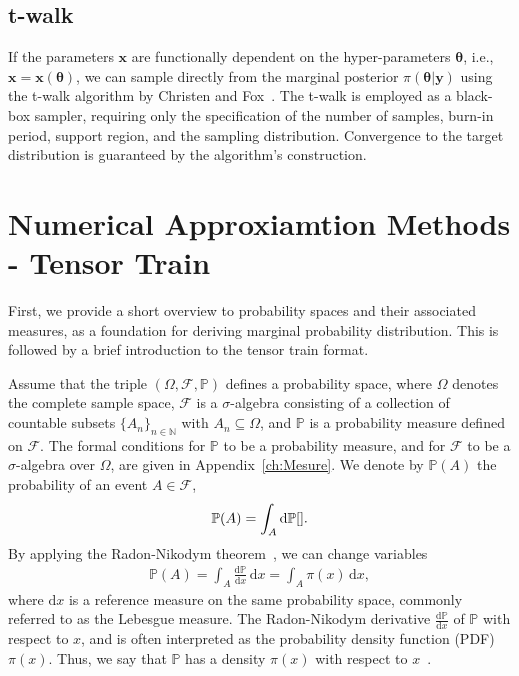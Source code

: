 \subsection{t-walk}
If the parameters $\bm{x}$ are functionally dependent on the hyper-parameters $\bm{\theta}$, i.e., $\bm{x} = \bm{x}(\bm{\theta})$, we can sample directly from the marginal posterior $\pi(\bm{\theta} | \bm{y})$ using the t-walk algorithm by Christen and Fox~\cite{christen2010general}. 
The t-walk is employed as a black-box sampler, requiring only the specification of the number of samples, burn-in period, support region, and the sampling distribution. 
Convergence to the target distribution is guaranteed by the algorithm’s construction.

\section{Numerical Approxiamtion Methods - Tensor Train}
\label{sec:tensortrain}
First, we provide a short overview to probability spaces and their associated measures, as a foundation for deriving marginal probability distribution. This is followed by a brief introduction to the tensor train format.

Assume that the triple $(\Omega, \mathcal{F}, \mathbb{P})$ defines a probability space, where $\Omega$ denotes the complete sample space, $\mathcal{F}$ is a $\sigma$-algebra consisting of a collection of countable subsets $\{A_n\}_{n \in \mathbb{N}}$ with $A_n \subseteq \Omega$, and $\mathbb{P}$ is a probability measure defined on $\mathcal{F}$. The formal conditions for $\mathbb{P}$ to be a probability measure, and for $\mathcal{F}$ to be a $\sigma$-algebra over $\Omega$, are given in Appendix~\ref{ch:Mesure}.
We denote by $\mathbb{P}(A)$ the probability of an event $A \in \mathcal{F}$,
\begin{align}
	\mathbb{P}(A) = \int_A \mathrm{d} \mathbb{P} \text{\cite{}}.
\end{align}
By applying the Radon-Nikodym theorem~\cite{kopp2004measintprob}, we can change variables
\begin{align}
	\mathbb{P}(A) = \int_A \frac{\mathrm{d} \mathbb{P}}{\mathrm{d}x} \, \mathrm{d}x = \int_A \pi(x) \, \mathrm{d}x,
\end{align}
where $\mathrm{d}x$ is a reference measure on the same probability space, commonly referred to as the Lebesgue measure. 
The Radon-Nikodym derivative $\frac{\mathrm{d} \mathbb{P}}{\mathrm{d}x}$ of $\mathbb{P}$ with respect to $x$, and is often interpreted as the probability density function (PDF) $\pi(x)$. Thus, we say that $\mathbb{P}$ has a density $\pi(x)$ with respect to $x$~\cite[Chapter 10]{simonnet1996measprob}.

